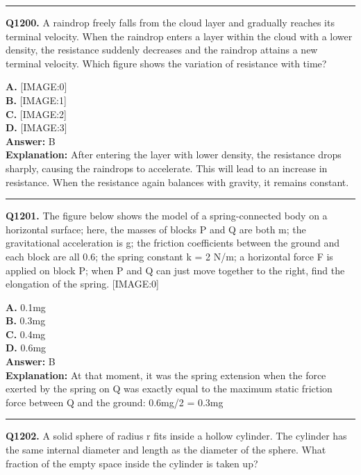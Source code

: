 \documentclass[12pt]{article}
\begin{document}
\hrule
\vspace{1em}


\noindent
\textbf{Q1200.} A raindrop freely falls from the cloud layer and gradually reaches its terminal velocity. When the raindrop enters a layer within the cloud with a lower density, the resistance suddenly decreases and the raindrop attains a new terminal velocity. Which figure shows the variation of resistance with time?



\textbf{A.} [IMAGE:0] \\
\textbf{B.} [IMAGE:1] \\
\textbf{C.} [IMAGE:2] \\
\textbf{D.} [IMAGE:3] \\

\textbf{Answer:} B \\
\textbf{Explanation:} After entering the layer with lower density, the resistance drops sharply, causing the raindrops to accelerate. This will lead to an increase in resistance. When the resistance again balances with gravity, it remains constant.

\hrule
\vspace{1em}


\noindent
\textbf{Q1201.} The figure below shows the model of a spring-connected body on a horizontal surface; here, the masses of blocks P and Q are both m; the gravitational acceleration is g; the friction coefficients between the ground and each block are all 0.6; the spring constant k = 2 N/m; a horizontal force F is applied on block P; when P and Q can just move together to the right, find the elongation of the spring.
[IMAGE:0]



\textbf{A.} 0.1mg \\
\textbf{B.} 0.3mg \\
\textbf{C.} 0.4mg \\
\textbf{D.} 0.6mg \\

\textbf{Answer:} B \\
\textbf{Explanation:} At that moment, it was the spring extension when the force exerted by the spring on Q was exactly equal to the maximum static friction force between Q and the ground: 0.6mg/2 = 0.3mg

\hrule
\vspace{1em}


\noindent
\textbf{Q1202.} A solid sphere of radius r fits inside a hollow cylinder. The cylinder has the same internal diameter and length as the diameter of the sphere. What fraction of the empty space inside the cylinder is taken up?
\end{document}
